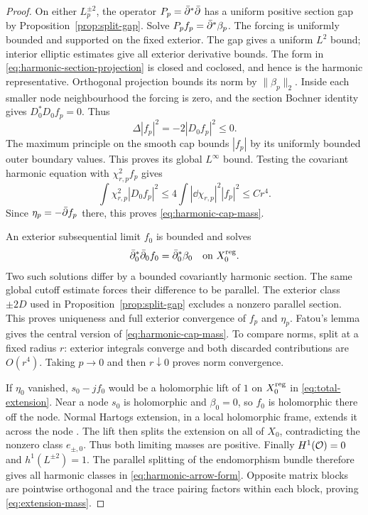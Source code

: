 \begin{proof}
On either $L_p^{\pm2}$, the operator
$P_p=\bar\partial^*\bar\partial$ has a uniform positive section gap by
Proposition~\ref{prop:split-gap}. Solve
$P_pf_p=\bar\partial^*\beta_p$. The forcing is uniformly bounded
and supported on the fixed exterior. The gap gives a uniform
$L^2$ bound; interior elliptic estimates give all exterior
derivative bounds. The form in
\eqref{eq:harmonic-section-projection} is closed and coclosed,
and hence is the harmonic representative. Orthogonal
projection bounds its norm by $\|\beta_p\|_2$.
Inside each smaller node neighbourhood the forcing is zero,
and the section Bochner identity gives $D_0^*D_0f_p=0$.
Thus
\[
 \Delta|f_p|^2=-2|D_0f_p|^2\le0.
\]
The maximum principle on the smooth cap bounds $|f_p|$
by its uniformly bounded outer boundary values. This
proves its global $L^\infty$ bound. Testing the covariant
harmonic equation with $\chi_{r,p}^2f_p$ gives
\[
 \int\chi_{r,p}^2|D_0f_p|^2
       \le4\int|\dd\chi_{r,p}|^2|f_p|^2\le Cr^4.
\]
Since $\eta_p=-\bar\partial f_p$ there, this proves
\eqref{eq:harmonic-cap-mass}.

An exterior subsequential limit $f_0$ is bounded and solves
\[
 \bar\partial_0^*\bar\partial_0f_0=\bar\partial_0^*\beta_0
                                      \quad\text{on }X_0^{\rm reg}.
\]
Two such solutions differ by a bounded covariantly harmonic
section. The same global cutoff estimate forces their
difference to be parallel. The exterior class $\pm2D$
used in Proposition~\ref{prop:split-gap} excludes a nonzero
parallel section. This proves uniqueness and full exterior
convergence of $f_p$ and $\eta_p$. Fatou's lemma gives the
central version of \eqref{eq:harmonic-cap-mass}. To compare
norms, split at a fixed radius $r$: exterior integrals
converge and both discarded contributions are $O(r^4)$.
Taking $p\to0$ and then $r\downarrow0$ proves norm convergence.

If $\eta_0$ vanished, $s_0-jf_0$ would be a holomorphic
lift of $1$ on $X_0^{\rm reg}$ in
\eqref{eq:total-extension}. Near a node $s_0$ is holomorphic
and $\beta_0=0$, so $f_0$ is holomorphic there off the node.
Normal Hartogs extension, in a local holomorphic frame,
extends it across the node
\cite[Chapter II, Corollary 7.8]{Demailly}. The lift then
splits the extension on all of $X_0$, contradicting the
nonzero class $e_{\pm,0}$. Thus both limiting masses are
positive. Finally $H^1(\mathcal O)=0$ and
$h^1(L^{\pm2})=1$. The parallel splitting of the endomorphism
bundle therefore gives all harmonic classes in
\eqref{eq:harmonic-arrow-form}. Opposite matrix blocks are
pointwise orthogonal and the trace pairing factors within
each block, proving \eqref{eq:extension-mass}.
\end{proof}

